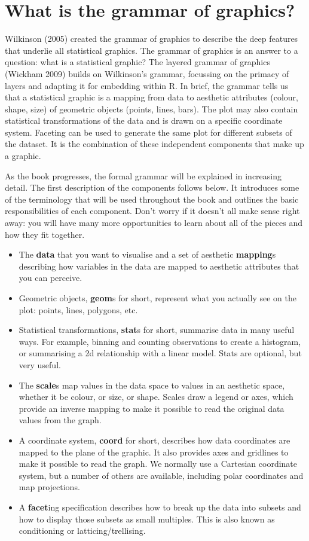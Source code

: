 \section{What is the grammar of graphics?}

Wilkinson (2005) created the grammar of graphics to describe the deep
features that underlie all statistical graphics. The grammar of graphics
is an answer to a question: what is a statistical graphic? The layered
grammar of graphics (Wickham 2009) builds on Wilkinson's grammar,
focussing on the primacy of layers and adapting it for embedding within
R. In brief, the grammar tells us that a statistical graphic is a
mapping from data to aesthetic attributes (colour, shape, size) of
geometric objects (points, lines, bars). The plot may also contain
statistical transformations of the data and is drawn on a specific
coordinate system. Faceting can be used to generate the same plot for
different subsets of the dataset. It is the combination of these
independent components that make up a graphic.

As the book progresses, the formal grammar will be explained in
increasing detail. The first description of the components follows
below. It introduces some of the terminology that will be used
throughout the book and outlines the basic responsibilities of each
component. Don't worry if it doesn't all make sense right away: you will
have many more opportunities to learn about all of the pieces and how
they fit together.

\begin{itemize}
\item
  The \textbf{data} that you want to visualise and a set of aesthetic
  \textbf{mapping}s describing how variables in the data are mapped to
  aesthetic attributes that you can perceive.
\item
  Geometric objects, \textbf{geom}s for short, represent what you
  actually see on the plot: points, lines, polygons, etc.
\item
  Statistical transformations, \textbf{stat}s for short, summarise data
  in many useful ways. For example, binning and counting observations to
  create a histogram, or summarising a 2d relationship with a linear
  model. Stats are optional, but very useful.
\item
  The \textbf{scale}s map values in the data space to values in an
  aesthetic space, whether it be colour, or size, or shape. Scales draw
  a legend or axes, which provide an inverse mapping to make it possible
  to read the original data values from the graph.
\item
  A coordinate system, \textbf{coord} for short, describes how data
  coordinates are mapped to the plane of the graphic. It also provides
  axes and gridlines to make it possible to read the graph. We normally
  use a Cartesian coordinate system, but a number of others are
  available, including polar coordinates and map projections.
\item
  A \textbf{facet}ing specification describes how to break up the data
  into subsets and how to display those subsets as small multiples. This
  is also known as conditioning or latticing/trellising.
\end{itemize}

